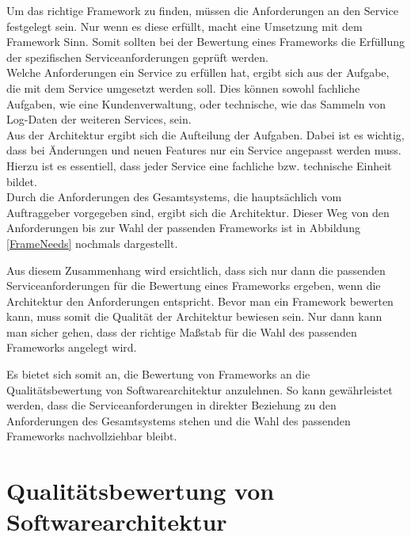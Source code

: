 Um das richtige Framework zu finden, müssen die Anforderungen an den Service festgelegt sein. Nur wenn es diese erfüllt, macht eine Umsetzung mit dem Framework Sinn. Somit sollten bei der Bewertung eines Frameworks die Erfüllung der spezifischen Serviceanforderungen geprüft werden.\\
Welche Anforderungen ein Service zu erfüllen hat, ergibt sich aus der Aufgabe, die mit dem Service umgesetzt werden soll. Dies können sowohl fachliche Aufgaben, wie eine Kundenverwaltung, oder technische, wie das Sammeln von Log-Daten der weiteren Services, sein.\\
Aus der Architektur ergibt sich die Aufteilung der Aufgaben. Dabei ist es wichtig, dass bei Änderungen und neuen Features nur ein Service angepasst werden muss. Hierzu ist es essentiell, dass jeder Service eine fachliche bzw. technische Einheit bildet.\\
Durch die Anforderungen des Gesamtsystems, die hauptsächlich vom Auftraggeber vorgegeben sind, ergibt sich die Architektur. Dieser Weg von den Anforderungen bis zur Wahl der passenden Frameworks ist in Abbildung \ref{FrameNeeds} nochmals dargestellt.
    
 
Aus diesem Zusammenhang wird ersichtlich, dass sich nur dann die passenden Serviceanforderungen für die Bewertung eines Frameworks ergeben, wenn die Architektur den Anforderungen entspricht. Bevor man ein Framework bewerten kann, muss somit die Qualität der Architektur bewiesen sein. Nur dann kann man sicher gehen, dass der richtige Maßstab für die Wahl des passenden Frameworks angelegt wird.

Es bietet sich somit an, die Bewertung von Frameworks an die Qualitätsbewertung von Softwarearchitektur anzulehnen. So kann gewährleistet werden, dass die Serviceanforderungen in direkter Beziehung zu den Anforderungen des Gesamtsystems stehen und die Wahl des passenden Frameworks nachvollziehbar bleibt.
 
\pagebreak
\section{Qualitätsbewertung von Softwarearchitektur}


